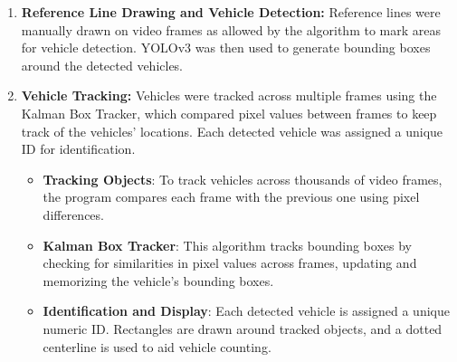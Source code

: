 {\begin{enumerate}
  \begin{itemize}
    \item \textbf{YOLO Model Settings}: Specify the location of the YOLO weight file, configure model settings (e.g., detection thresholds), and check available GPUs for processing.
    \item \textbf{Video File Settings}: Configure the video file name and its location for vehicle detection. Ensure the video is in \texttt{.mp4} format.
    \item \textbf{Prepare Video}: Convert the video files to \texttt{.mp4} if necessary and merge multiple video files if needed, as the program processes only one file at a time.
    \item \textbf{Upload Video}: Drag and drop the \texttt{.mp4} video into the input section. Enter the video name (excluding the \texttt{.mp4} extension) into the program.
    \item \textbf{Check and Process}: Run the program to verify the input files and settings. Once verified, the vehicle detection process can begin.
  \end{itemize}
  \item \textbf{Reference Line Drawing and Vehicle Detection:} Reference lines were manually drawn on video frames as allowed by the algorithm to mark areas for vehicle detection. YOLOv3 was then used to generate bounding boxes around the detected vehicles.
  \item \textbf{Vehicle Tracking:} Vehicles were tracked across multiple frames using the Kalman Box Tracker, which compared pixel values between frames to keep track of the vehicles' locations. Each detected vehicle was assigned a unique ID for identification.
  \begin{itemize}
    \item \textbf{Tracking Objects}: To track vehicles across thousands of video frames, the program compares each frame with the previous one using pixel differences.
    \item \textbf{Kalman Box Tracker}: This algorithm tracks bounding boxes by checking for similarities in pixel values across frames, updating and memorizing the vehicle’s bounding boxes.
    \item \textbf{Identification and Display}: Each detected vehicle is assigned a unique numeric ID. Rectangles are drawn around tracked objects, and a dotted centerline is used to aid vehicle counting.

\end{itemize}
\end{enumerate}}
